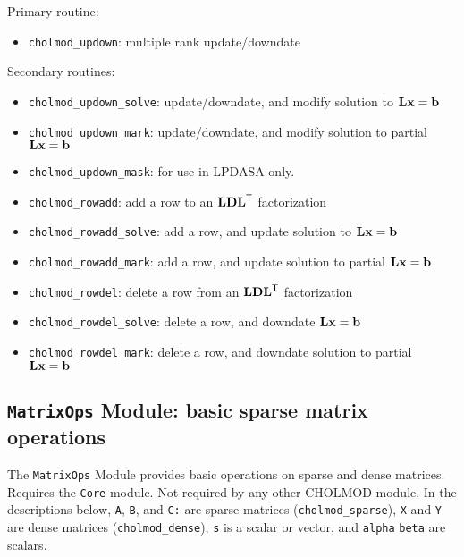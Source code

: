 \documentclass[11pt]{article}
\newcommand{\m}[1]{{\bf{#1}}}       %
\newcommand{\tr}{^{\sf T}}          %
\begin{document}
\vspace{0.1in}
\noindent Primary routine:
    \begin{itemize}
    \item {\tt cholmod\_updown}: multiple rank update/downdate
    \end{itemize}

\noindent Secondary routines:
    \begin{itemize}
    \item {\tt cholmod\_updown\_solve}: update/downdate, and modify solution to $\m{Lx=b}$
    \item {\tt cholmod\_updown\_mark}: update/downdate, and modify solution to partial $\m{Lx=b}$
    \item {\tt cholmod\_updown\_mask}: for use in LPDASA only.
    \item {\tt cholmod\_rowadd}: add a row to an $\m{LDL}\tr$ factorization
    \item {\tt cholmod\_rowadd\_solve}: add a row, and update solution to $\m{Lx=b}$
    \item {\tt cholmod\_rowadd\_mark}: add a row, and update solution to partial $\m{Lx=b}$
    \item {\tt cholmod\_rowdel}: delete a row from an $\m{LDL}\tr$ factorization
    \item {\tt cholmod\_rowdel\_solve}: delete a row, and downdate $\m{Lx=b}$
    \item {\tt cholmod\_rowdel\_mark}: delete a row, and downdate solution to partial $\m{Lx=b}$
    \end{itemize}

\subsection{{\tt MatrixOps} Module: basic sparse matrix operations}

The {\tt MatrixOps} Module provides
basic operations on sparse and dense matrices.
Requires the {\tt Core} module.  Not required by any other CHOLMOD module.
In the descriptions below,
{\tt A}, {\tt B}, and {\tt C:} are sparse matrices ({\tt cholmod\_sparse}),
{\tt X} and {\tt Y} are dense matrices ({\tt cholmod\_dense}),
{\tt s} is a scalar or vector, and
{\tt alpha} {\tt beta} are scalars.
\end{document}
